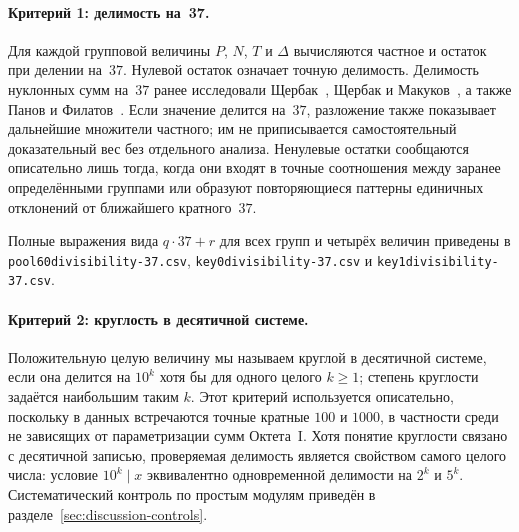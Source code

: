 \documentclass[11pt,a4paper]{article}
\renewcommand{\_}{\origunderscore\allowbreak}
\begin{document}
\paragraph{Критерий 1: делимость на~37.}
Для каждой групповой величины $P$, $N$, $T$ и $\Delta$ вычисляются
частное и остаток при делении на~$37$. Нулевой остаток означает точную
делимость. Делимость нуклонных сумм на~$37$ ранее исследовали
Щербак~\cite{shcherbak1993,shcherbak2003}, Щербак и Макуков~\cite{makukov2013}, а также Панов и Филатов~\cite{panov2024}. Если значение
делится на~$37$, разложение также показывает дальнейшие множители
частного; им не приписывается самостоятельный доказательный вес без
отдельного анализа. Ненулевые остатки сообщаются описательно лишь тогда, когда они
входят в точные соотношения между заранее определёнными группами или
образуют повторяющиеся паттерны единичных отклонений от ближайшего
кратного~$37$.

Полные выражения вида $q\cdot37+r$ для всех групп и четырёх величин
приведены в
\texttt{pool60\_divisibility-37.csv},
\texttt{key0\_divisibility-37.csv} и
\texttt{key1\_divisibility-37.csv}.

\paragraph{Критерий 2: круглость в десятичной системе.}
Положительную целую величину мы называем круглой в десятичной системе,
если она делится на $10^k$ хотя бы для одного целого $k\geq1$; степень
круглости задаётся наибольшим таким $k$. Этот критерий используется
описательно, поскольку в данных встречаются точные кратные $100$ и
$1000$, в частности среди не зависящих от параметризации сумм
Октета~I. Хотя понятие круглости связано с десятичной записью, проверяемая
делимость является свойством самого целого числа: условие
$10^k\mid x$ эквивалентно одновременной делимости на $2^k$ и $5^k$.
Систематический контроль по простым модулям приведён в
разделе~\ref{sec:discussion-controls}.
\end{document}
